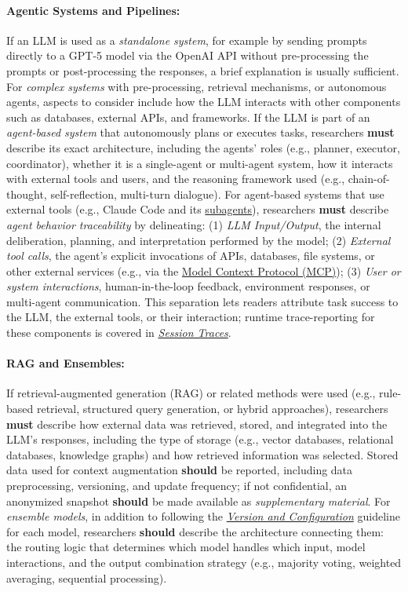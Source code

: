 \documentclass[smallextended]{svjour3}
\newcommand{\must}{\textbf{must}\xspace}
\newcommand{\should}{\textbf{should}\xspace}
\newcommand{\supplementarymaterial}{\emph{supplementary material}\xspace}
\newcommand{\supplementarymaterial}{\emph{supplementary material}\xspace}
\newcommand{\modelversion}{\hyperref[sec:report-model-version-configuration-and-customizations]{\emph{Version and Configuration}}\xspace}
\newcommand{\traces}{\hyperref[sec:report-session-traces]{\emph{Session Traces}}\xspace}
\newcommand{\modelversion}{\href{/guidelines\#report-model-version-configuration-and-customizations}{\emph{Version and Configuration}}\xspace}
\newcommand{\traces}{\href{/guidelines\#report-session-traces}{\emph{Session Traces}}\xspace}
\begin{document}
\paragraph{Agentic Systems and Pipelines:}
If an LLM is used as a \emph{standalone system}, for example by sending prompts directly to a GPT-5 model via the OpenAI API without pre-processing the prompts or post-processing the responses, a brief explanation is usually sufficient.
For \emph{complex systems} with pre-processing, retrieval mechanisms, or autonomous agents, aspects to consider include how the LLM interacts with other components such as databases, external APIs, and frameworks.
If the LLM is part of an \emph{agent-based system} that autonomously plans or executes tasks, researchers \must describe its exact architecture, including the agents' roles (e.g., planner, executor, coordinator), whether it is a single-agent or multi-agent system, how it interacts with external tools and users, and the reasoning framework used (e.g., chain-of-thought, self-reflection, multi-turn dialogue).
For agent-based systems that use external tools (e.g., Claude Code and its \href{https://docs.anthropic.com/en/docs/claude-code/sub-agents}{subagents}), researchers \must describe \emph{agent behavior traceability} by delineating: (1) \emph{LLM Input/Output}, the internal deliberation, planning, and interpretation performed by the model; (2) \emph{External tool calls}, the agent's explicit invocations of APIs, databases, file systems, or other external services (e.g., via the \href{https://modelcontextprotocol.io/}{Model Context Protocol (MCP)}); (3) \emph{User or system interactions}, human-in-the-loop feedback, environment responses, or multi-agent communication.
This separation lets readers attribute task success to the LLM, the external tools, or their interaction; runtime trace-reporting for these components is covered in \traces.

\paragraph{RAG and Ensembles:}
If retrieval-augmented generation (RAG) or related methods were used (e.g., rule-based retrieval, structured query generation, or hybrid approaches), researchers \must describe how external data was retrieved, stored, and integrated into the LLM's responses, including the type of storage (e.g., vector databases, relational databases, knowledge graphs) and how retrieved information was selected.
Stored data used for context augmentation \should be reported, including data preprocessing, versioning, and update frequency; if not confidential, an anonymized snapshot \should be made available as \supplementarymaterial.
For \emph{ensemble models}, in addition to following the \modelversion guideline for each model, researchers \should describe the architecture connecting them: the routing logic that determines which model handles which input, model interactions, and the output combination strategy (e.g., majority voting, weighted averaging, sequential processing).
\end{document}
